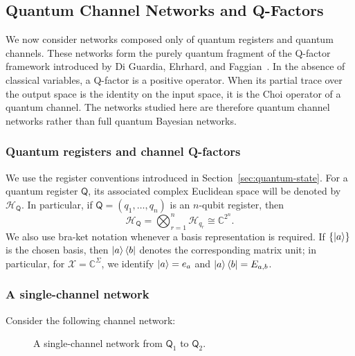 \documentclass[
    aps,
    pra,
    reprint,
    superscriptaddress,
    nofootinbib
]{revtex4-2}
\theoremstyle{definition}
\theoremstyle{plain}
\begin{document}
\subsection{Quantum Channel Networks and Q-Factors}
\label{subsection:qbn1}

We now consider networks composed only of quantum registers and quantum
channels. These networks form the purely quantum fragment of the Q-factor
framework introduced by Di Guardia, Ehrhard, and
Faggian~\cite[Defs.~13 and~19]{DiGuardiaEhrhardFaggian2026}. In the absence
of classical variables, a Q-factor is a positive operator. When its partial
trace over the output space is the identity on the input space, it is the
Choi operator of a quantum channel. The networks studied here are therefore
quantum channel networks rather than full quantum Bayesian networks.

\subsubsection{Quantum registers and channel Q-factors}

We use the register conventions introduced in
Section~\ref{sec:quantum-state}. For a quantum register $\mathsf{Q}$, its
associated complex Euclidean space will be denoted by
$\mathcal{H}_{\mathsf{Q}}$. In particular, if
$\mathsf{Q}=(q_{1},\dots,q_{n})$ is an $n$-qubit register, then
\begin{equation}
    \mathcal{H}_{\mathsf{Q}}
    =
    \bigotimes_{r=1}^{n}\mathcal{H}_{q_{r}}
    \cong
    \mathbb{C}^{2^{n}}.
\end{equation}
We also use bra-ket notation whenever a basis representation is required.
If $\{\ket{a}\}$ is the chosen basis, then $\ket{a}\bra{b}$ denotes the
corresponding matrix unit; in particular, for
$\mathcal{X}=\mathbb{C}^{\Sigma}$, we identify $\ket{a}=e_a$ and
$\ket{a}\bra{b}=E_{a,b}$.

\subsubsection{A single-channel network}

Consider the following channel network:
\begin{figure}[ht]
    \centering
    \caption{A single-channel network from $\mathsf{Q}_{1}$ to
    $\mathsf{Q}_{2}$.}
    \label{fig:qbn}
\end{figure}
\end{document}
